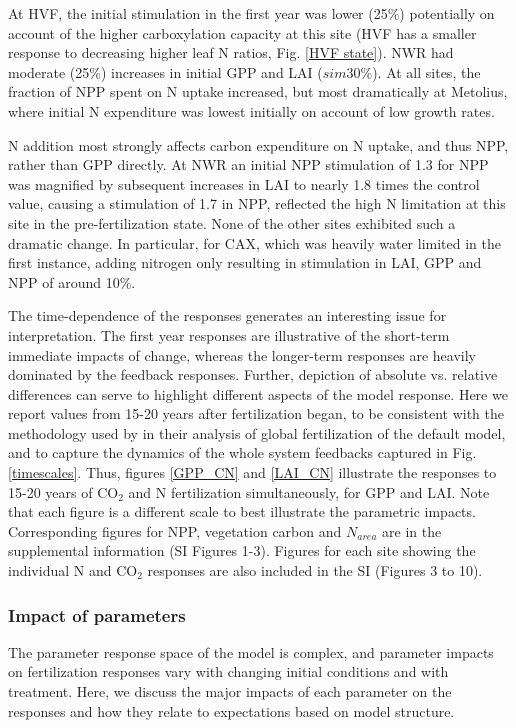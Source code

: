 \documentclass[draft,linenumbers]{agujournal}
\begin{document}
 At HVF, the initial stimulation in the first year was lower (25\%) potentially on account of the higher carboxylation capacity at this site (HVF has a smaller response to decreasing higher leaf N ratios, Fig. \ref{HVF state}). NWR had moderate (25\%) increases in initial GPP and LAI ($sim$30\%).  At all sites, the fraction of NPP spent on N uptake increased, but most dramatically at Metolius, where initial N expenditure was lowest initially on account of low growth rates. 
 
N addition most strongly affects carbon expenditure on N uptake, and thus NPP, rather than GPP directly. At NWR an initial NPP stimulation of 1.3 for NPP was magnified by subsequent increases in LAI to nearly 1.8 times the control value, causing a stimulation of 1.7 in NPP, reflected the high N limitation at this site in the pre-fertilization state. None of the other sites exhibited such a dramatic change. In particular, for CAX, which was heavily water limited in the first instance, adding nitrogen only resulting in stimulation in LAI, GPP and NPP of around 10\%. 

The time-dependence of the responses generates an interesting issue for interpretation. The first year responses are illustrative of the short-term immediate impacts of change, whereas the longer-term responses are heavily dominated by the feedback responses. Further, depiction of absolute vs. relative differences can serve to highlight different aspects of the model response. Here we report values from 15-20 years after fertilization began, to be consistent with the methodology used by \cite{wieder2019} in their analysis of global fertilization of the default model, and to capture the dynamics of the whole system feedbacks captured in Fig. \ref{timescales}.  Thus, figures \ref{GPP_CN} and \ref{LAI_CN} illustrate the responses to 15-20 years of CO$_{2}$ and N  fertilization simultaneously, for GPP and LAI.  Note that each figure is a different scale to best illustrate the parametric impacts.  Corresponding figures for NPP, vegetation carbon and $N_{area}$ are in the supplemental information (SI Figures 1-3). Figures for each site showing the individual N and CO$_{2}$ responses are also included in the SI (Figures 3 to 10).  

\subsubsection{Impact of parameters}
The parameter response space of the model is complex, and parameter impacts on fertilization responses vary with changing initial conditions and with treatment. Here, we discuss the major impacts of each parameter on the responses and how they relate to expectations based on model structure. 
\end{document}
